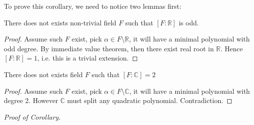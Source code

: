 \documentclass[../book.tex]{subfiles}
\begin{document}
To prove this corollary, we need to notice two lemmas first:

\begin{lem}
There does not exists non-trivial field $F$ such that $[F: \mathbb{R}]$ is odd.
\end{lem}
\begin{proof}
Assume such $F$ exist, pick $ \alpha \in F\setminus \mathbb{R}$, it will have a minimal polynomial with odd degree. By immediate value theorem, then there exist real root in $\mathbb{R}$. Hence $[F: \mathbb{R}]=1$, i.e. this is a trivial extension.
\end{proof}
\begin{lem}
There does not exists field $F$ such that $[F: \mathbb{C}]=2$
\end{lem}
\begin{proof}
Assume such $F$ exist, pick $ \alpha \in F\setminus \mathbb{C}$, it will have a minimal polynomial with degree 2. However $\mathbb{C}$ must split any quadratic polynomial. Contradiction.
\end{proof}

\textit{Proof of Corollary.}
\end{document}
